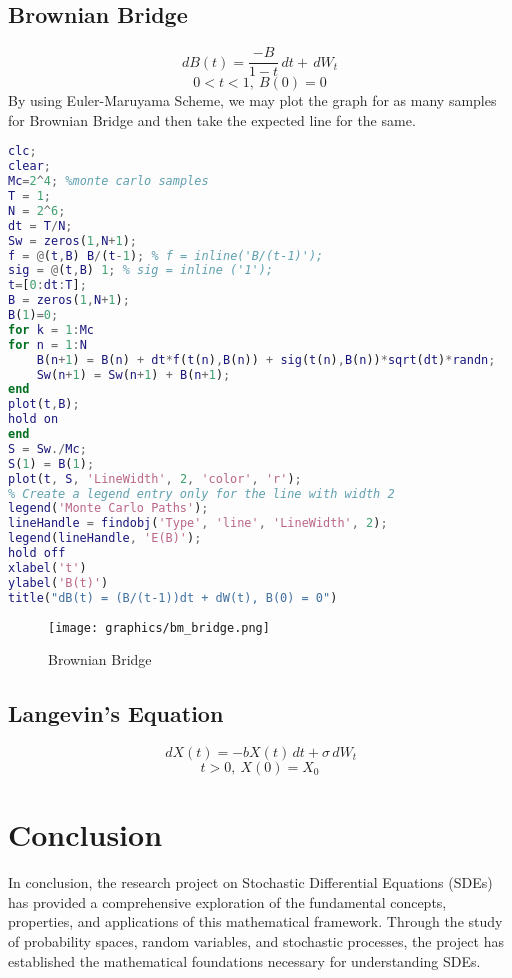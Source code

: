 \documentclass[twoside,final]{hcmut-report}
\begin{document}
        \subsection{Brownian Bridge}
        \[dB(t) = \frac{-B}{1-t}\,dt + \,dW_t\]
        \[0 < t < 1,\ B(0) = 0\]
    By using Euler-Maruyama Scheme, we may plot the graph for as many samples for Brownian Bridge and then take the expected line for the same.
        \begin{lstlisting}[language=Matlab, caption={My MATLAB Code}, label={lst:matlabcode}]
clc;
clear;
Mc=2^4; %monte carlo samples
T = 1;
N = 2^6;
dt = T/N;
Sw = zeros(1,N+1);
f = @(t,B) B/(t-1); % f = inline('B/(t-1)');
sig = @(t,B) 1; % sig = inline ('1');
t=[0:dt:T];
B = zeros(1,N+1);
B(1)=0;
for k = 1:Mc
for n = 1:N
    B(n+1) = B(n) + dt*f(t(n),B(n)) + sig(t(n),B(n))*sqrt(dt)*randn;  
    Sw(n+1) = Sw(n+1) + B(n+1);   
end
plot(t,B);
hold on
end
S = Sw./Mc;
S(1) = B(1);
plot(t, S, 'LineWidth', 2, 'color', 'r');
% Create a legend entry only for the line with width 2
legend('Monte Carlo Paths');
lineHandle = findobj('Type', 'line', 'LineWidth', 2);
legend(lineHandle, 'E(B)');
hold off
xlabel('t')
ylabel('B(t)')
title("dB(t) = (B/(t-1))dt + dW(t), B(0) = 0")


\end{lstlisting}

\begin{figure}[h]
      \centering
                    \texttt{[image: graphics/bm\_bridge.png]}
                    \caption{Brownian Bridge}
\end{figure}
        \subsection{Langevin's Equation}
        \[\,dX(t) = -bX(t)\,dt + \sigma\,dW_t\]
        \[t > 0 , \ X(0) = X_0\]

\pagebreak
\section{Conclusion}

In conclusion, the research project on Stochastic Differential Equations (SDEs) has provided a comprehensive exploration of the fundamental concepts, properties, and applications of this mathematical framework. Through the study of probability spaces, random variables, and stochastic processes, the project has established the mathematical foundations necessary for understanding SDEs.
\end{document}
